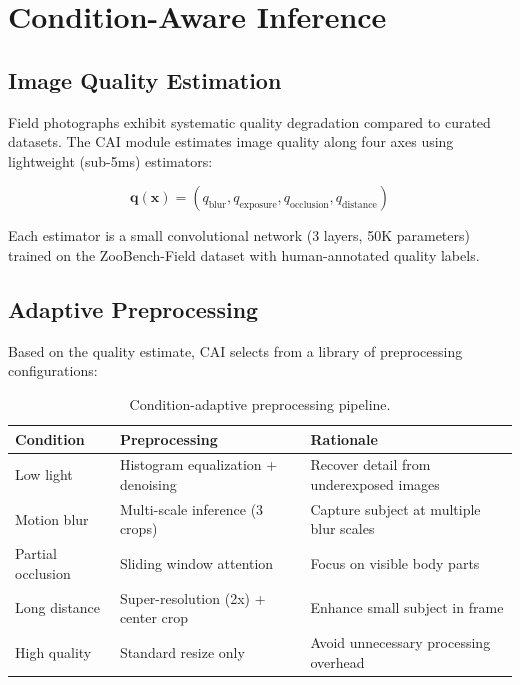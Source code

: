 \section{Condition-Aware Inference}

\label{sec:condition}

\subsection{Image Quality Estimation}

Field photographs exhibit systematic quality degradation compared to curated datasets.
The CAI module estimates image quality along four axes using lightweight (sub-5ms) estimators:

\begin{equation}
    \mathbf{q}(\mathbf{x}) = (q_{\text{blur}}, q_{\text{exposure}}, q_{\text{occlusion}}, q_{\text{distance}})
\end{equation}

Each estimator is a small convolutional network (3 layers, 50K parameters) trained on the ZooBench-Field dataset with human-annotated quality labels.

\subsection{Adaptive Preprocessing}

Based on the quality estimate, CAI selects from a library of preprocessing configurations:

\begin{table}[H]
\centering
\caption{Condition-adaptive preprocessing pipeline.}
\label{tab:preprocessing}
\begin{tabularx}{\textwidth}{@{}llX@{}}
\toprule
\textbf{Condition} & \textbf{Preprocessing} & \textbf{Rationale} \\
\midrule
Low light & Histogram equalization + denoising & Recover detail from underexposed images \\
Motion blur & Multi-scale inference (3 crops) & Capture subject at multiple blur scales \\
Partial occlusion & Sliding window attention & Focus on visible body parts \\
Long distance & Super-resolution (2x) + center crop & Enhance small subject in frame \\
High quality & Standard resize only & Avoid unnecessary processing overhead \\
\bottomrule
\end{tabularx}
\end{table}


